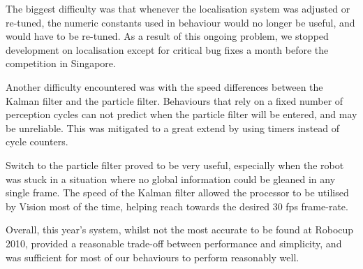 \documentclass[pdftex,11pt,a4paper]{report}
\begin{document}
The biggest difficulty was that whenever the localisation system was adjusted or re-tuned, the numeric constants used in behaviour would no longer  be useful, and would have to be re-tuned. As a result of this ongoing problem, we stopped development on localisation except for critical bug fixes a month before the competition in Singapore.

Another difficulty encountered was with the speed differences between the Kalman filter and the particle filter. Behaviours that rely on a fixed number of perception cycles can not predict when the particle filter will be entered, and may be unreliable. This was mitigated to a great extend by using timers instead of cycle counters.

Switch to the particle filter proved to be very useful, especially when the robot was stuck in a situation where no global information could be gleaned in any single frame. The speed of the Kalman filter allowed the processor to be utilised by Vision most of the time, helping reach towards the desired 30 fps frame-rate.

Overall, this year's system, whilst not the most accurate to be found at Robocup 2010, provided a reasonable trade-off between performance and simplicity, and was sufficient for most of our behaviours to perform reasonably well.
\end{document}
